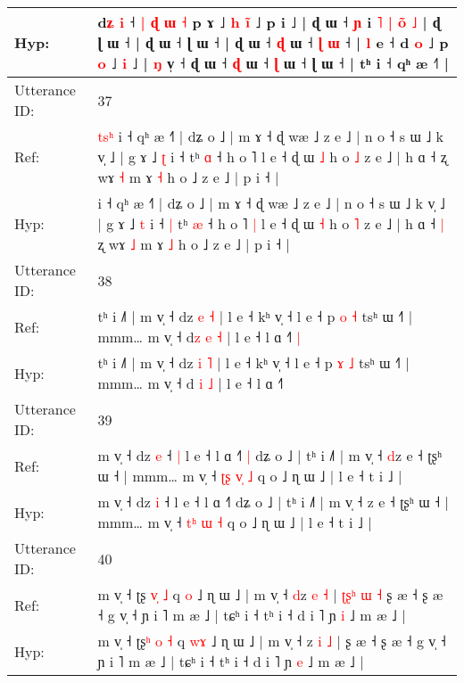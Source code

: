 \documentclass[10pt]{article}
\DeclareRobustCommand{\hl}[1]{{\textcolor{red}{#1}}}
\begin{document}
\begin{longtable}{ll}
Hyp: & d\hl{ʑ} \hl{i} ˧ \hl{|} \hl{ɖ}\hl{ }\hl{ɯ} \hl{˧} p ɤ ˩\hl{ }\hl{h} \hl{i}\hl{̃} ˩ p i ˩ | ɖ ɯ ˧ \hl{ɲ} i\hl{}\hl{}\hl{}\hl{}\hl{}\hl{}\hl{}\hl{}\hl{}\hl{} \hl{˥} \hl{|} \hl{}\hl{o}\hl{̃} \hl{˩} | ɖ\hl{}\hl{}\hl{}\hl{} ɭ ɯ ˧ | ɖ ɯ ˧ ɭ ɯ ˧ | ɖ ɯ ˧ \hl{ɖ} ɯ ˧ \hl{ɭ} \hl{}\hl{ɯ} ˧ | \hl{}\hl{l} e ˧ d \hl{}\hl{o} ˩ p \hl{o} ˩ \hl{}\hl{i} ˩ |\hl{}\hl{}\hl{}\hl{}\hl{} \hl{ŋ} v̩ ˧ ɖ ɯ ˧ \hl{ɖ} ɯ ˧ \hl{ɭ} ɯ ˧ ɭ ɯ ˧ | tʰ i ˧ qʰ æ ˧˥ |
 \\
\midrule
Utterance ID: & 37 \\
Ref: & \hl{t}\hl{s}\hl{ʰ}\hl{ }i ˧ qʰ æ ˧˥ | dʑ o ˩ | m ɤ ˧ ɖ wæ ˩ z e ˩ | n o ˧ s ɯ ˩ k v̩ ˩ | g ɤ ˩ \hl{ʈ} i ˧\hl{}\hl{} tʰ \hl{ɑ} ˧ h o ˥\hl{}\hl{} l e ˧ ɖ ɯ \hl{˩} h o \hl{˩} z e ˩ | h ɑ ˧\hl{}\hl{} ʐ wɤ \hl{˧} m ɤ \hl{˧} h o ˩ z e ˩ | p i ˧ |
 \\
Hyp: & \hl{}\hl{}\hl{}\hl{}i ˧ qʰ æ ˧˥ | dʑ o ˩ | m ɤ ˧ ɖ wæ ˩ z e ˩ | n o ˧ s ɯ ˩ k v̩ ˩ | g ɤ ˩ \hl{t} i ˧\hl{ }\hl{|} tʰ \hl{æ} ˧ h o ˥\hl{ }\hl{|} l e ˧ ɖ ɯ \hl{˧} h o \hl{˥} z e ˩ | h ɑ ˧\hl{ }\hl{|} ʐ wɤ \hl{˩} m ɤ \hl{˩} h o ˩ z e ˩ | p i ˧ |
 \\
\midrule
Utterance ID: & 38 \\
Ref: & tʰ i ˩˥ | m v̩ ˧ dz \hl{e} \hl{˧} | l e ˧ kʰ v̩ ˧ l e ˧ p \hl{o} \hl{˧} tsʰ ɯ ˧˥ | mmm… m v̩ ˧ d\hl{z} \hl{e} \hl{˧} | l e ˧ l ɑ ˧˥\hl{ }\hl{|}
 \\
Hyp: & tʰ i ˩˥ | m v̩ ˧ dz \hl{i} \hl{˥} | l e ˧ kʰ v̩ ˧ l e ˧ p \hl{ɤ} \hl{˩} tsʰ ɯ ˧˥ | mmm… m v̩ ˧ d\hl{} \hl{i} \hl{˩} | l e ˧ l ɑ ˧˥\hl{}\hl{}
 \\
\midrule
Utterance ID: & 39 \\
Ref: & m v̩ ˧ dz \hl{e} ˧\hl{ }\hl{|} l e ˧ l ɑ ˧˥\hl{ }\hl{|} dʑ o ˩ | tʰ i ˩˥ | m v̩ ˧ \hl{d}z e ˧ ʈʂʰ ɯ ˧ | mmm… m v̩ ˧ \hl{ʈ}\hl{ʂ} \hl{v}\hl{̩} \hl{˩} q o ˩ ɳ ɯ ˩ | l e ˧ t i ˩ |
 \\
Hyp: & m v̩ ˧ dz \hl{i} ˧\hl{}\hl{} l e ˧ l ɑ ˧˥\hl{}\hl{} dʑ o ˩ | tʰ i ˩˥ | m v̩ ˧ \hl{}z e ˧ ʈʂʰ ɯ ˧ | mmm… m v̩ ˧ \hl{t}\hl{ʰ} \hl{}\hl{ɯ} \hl{˧} q o ˩ ɳ ɯ ˩ | l e ˧ t i ˩ |
 \\
\midrule
Utterance ID: & 40 \\
Ref: & m v̩ ˧ ʈʂ\hl{ }\hl{v}\hl{̩} \hl{˩} q \hl{}\hl{o} ˩ ɳ ɯ ˩ | m v̩ ˧ \hl{d}z \hl{e} \hl{˧} |\hl{ }\hl{ʈ}\hl{ʂ}\hl{ʰ}\hl{ }\hl{ɯ}\hl{ }\hl{˧} ʂ æ ˧ ʂ æ ˧ g v̩ ˧ ɲ i ˥ m æ ˩ | tɕʰ i ˧ tʰ i ˧ d i ˥ ɲ \hl{i} ˩ m æ ˩ |
 \\
Hyp: & m v̩ ˧ ʈʂ\hl{ʰ}\hl{ }\hl{o} \hl{˧} q \hl{w}\hl{ɤ} ˩ ɳ ɯ ˩ | m v̩ ˧ \hl{}z \hl{i} \hl{˩} |\hl{}\hl{}\hl{}\hl{}\hl{}\hl{}\hl{}\hl{} ʂ æ ˧ ʂ æ ˧ g v̩ ˧ ɲ i ˥ m æ ˩ | tɕʰ i ˧ tʰ i ˧ d i ˥ ɲ \hl{e} ˩ m æ ˩ |

\end{longtable}
\end{document}
